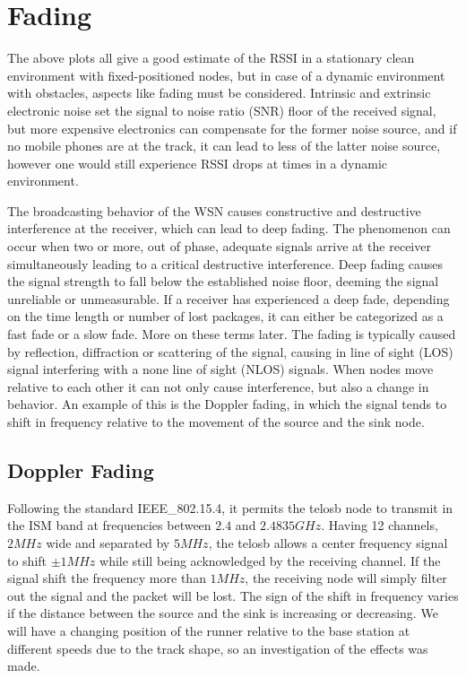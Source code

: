 \section{Fading}\label{sc:fading}
The above plots all give a good estimate of the RSSI in a stationary clean environment with fixed-positioned nodes, but in case of a dynamic environment with obstacles, aspects like fading must be considered. Intrinsic and extrinsic electronic noise set the signal to noise ratio (SNR) floor of the received signal, but more expensive electronics can compensate for the former noise source, and if no mobile phones are at the track, it can lead to less of the latter noise source, however one would still 
experience RSSI drops at times in a dynamic environment.

\noindent The broadcasting behavior of the WSN causes constructive and destructive interference at the receiver, which can lead to deep fading. The phenomenon can occur when two or more, out of phase, adequate signals arrive at the receiver simultaneously leading to a critical destructive interference. Deep fading causes the signal strength to fall below the established noise floor, deeming the signal unreliable or unmeasurable. If a receiver has experienced a deep fade, depending on the time length or number of lost packages, it can either be categorized as a fast fade or a slow fade. More on these terms later. The fading is typically caused by reflection, diffraction or scattering of the signal, causing in line of sight (LOS) signal interfering with a none line of sight (NLOS) signals. When nodes move relative to each other it can not only cause interference, but also a change in behavior. An example of this is the Doppler fading, in which the signal tends to shift in frequency relative to the movement of the source and the sink node.

\subsection{Doppler Fading}
Following the standard IEEE\_802.15.4, it permits the telosb node to transmit in the ISM band at frequencies between $2.4$ and $2.4835 GHz$. Having 12 channels, $2 MHz$ wide and separated by $5 MHz$, the telosb allows a center frequency signal to shift $\pm 1 MHz$ while still being acknowledged by the receiving channel. If the signal shift the frequency more than $1 MHz$, the receiving node will simply filter out the signal and the packet will be lost. The sign of the shift in frequency varies if the distance between the source and the sink is increasing or decreasing. We will have a changing position of the runner relative to the base station at different speeds due to the track shape, so an investigation of the effects was made.

